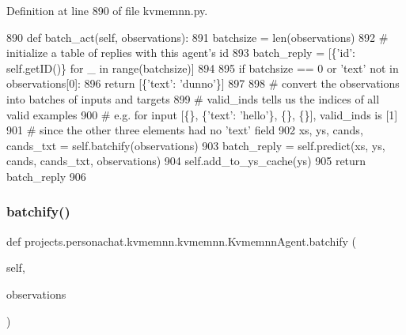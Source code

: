 Definition at line 890 of file kvmemnn.\+py.


\begin{DoxyCode}
890     \textcolor{keyword}{def }batch\_act(self, observations):
891         batchsize = len(observations)
892         \textcolor{comment}{# initialize a table of replies with this agent's id}
893         batch\_reply = [\{\textcolor{stringliteral}{'id'}: self.getID()\} \textcolor{keywordflow}{for} \_ \textcolor{keywordflow}{in} range(batchsize)]
894 
895         \textcolor{keywordflow}{if} batchsize == 0 \textcolor{keywordflow}{or} \textcolor{stringliteral}{'text'} \textcolor{keywordflow}{not} \textcolor{keywordflow}{in} observations[0]:
896             \textcolor{keywordflow}{return} [\{\textcolor{stringliteral}{'text'}: \textcolor{stringliteral}{'dunno'}\}]
897 
898         \textcolor{comment}{# convert the observations into batches of inputs and targets}
899         \textcolor{comment}{# valid\_inds tells us the indices of all valid examples}
900         \textcolor{comment}{# e.g. for input [\{\}, \{'text': 'hello'\}, \{\}, \{\}], valid\_inds is [1]}
901         \textcolor{comment}{# since the other three elements had no 'text' field}
902         xs, ys, cands, cands\_txt = self.batchify(observations)
903         batch\_reply = self.predict(xs, ys, cands, cands\_txt, observations)
904         self.add\_to\_ys\_cache(ys)
905         \textcolor{keywordflow}{return} batch\_reply
906 
\end{DoxyCode}
\mbox{\label{classprojects_1_1personachat_1_1kvmemnn_1_1kvmemnn_1_1KvmemnnAgent_ab5ea8fd94b0871ae14c7fafe41aa7af2}} 
\subsubsection{\texorpdfstring{batchify()}{batchify()}}
{\footnotesize\ttfamily def projects.\+personachat.\+kvmemnn.\+kvmemnn.\+Kvmemnn\+Agent.\+batchify (\begin{DoxyParamCaption}\item[{}]{self,  }\item[{}]{observations }\end{DoxyParamCaption})}

